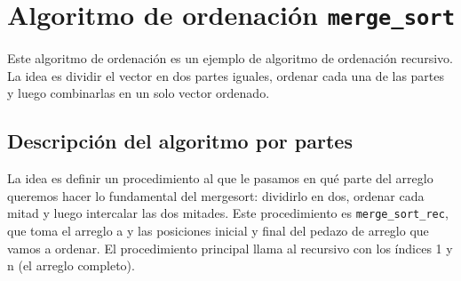 \section{Algoritmo de ordenación \texttt{merge\_sort}}

Este algoritmo de ordenación es un ejemplo de algoritmo de ordenación recursivo. La idea es dividir el vector en dos partes iguales, ordenar cada una de las partes y luego combinarlas en un solo vector ordenado. 

\subsection{Descripción del algoritmo por partes}
La idea es definir un procedimiento al que le pasamos en qué parte del arreglo queremos hacer lo fundamental del mergesort: dividirlo en dos, ordenar cada mitad y luego intercalar las dos mitades. Este procedimiento es \texttt{merge\_sort\_rec}, que toma el arreglo a y las posiciones inicial y final del pedazo de arreglo que vamos a ordenar. El procedimiento principal llama al recursivo con los índices 1 y n (el arreglo completo).

